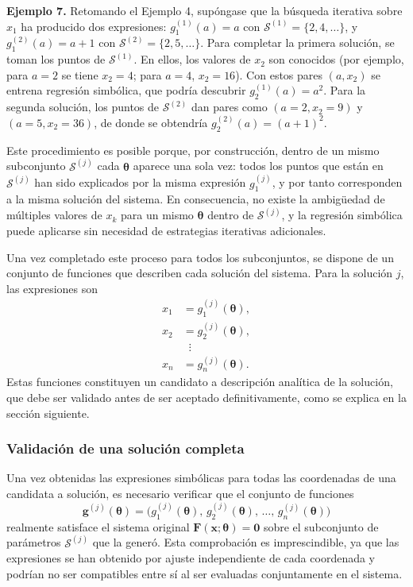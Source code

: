 \documentclass[12pt,a4paper]{article} \usepackage[utf8]{inputenc} \usepackage[spanish]{babel} \usepackage{amsmath, amssymb, amsthm} \usepackage{bm} \usepackage{float} \usepackage{longtable} \usepackage[hidelinks]{hyperref}
\newcommand{\xvec}{\mathbf{x}} \newcommand{\thetavec}{\boldsymbol{\theta}} \newcommand{\Fvec}{\mathbf{F}} \newcommand{\R}{\mathbb{R}} \newcommand{\norm}[1]{\left\lVert#1\right\rVert} \newcommand{\loss}{\mathcal{L}} \newcommand{\dataset}{\mathcal{D}} \newcommand{\jac}{\mathbf{J}}
\begin{document}
\bigskip
\noindent\textbf{Ejemplo 7.} Retomando el Ejemplo 4, supóngase que la
búsqueda iterativa sobre \(x_1\) ha producido dos expresiones:
\(g_1^{(1)}(a) = a\) con \(\mathcal{S}^{(1)} = \{2, 4, \dots\}\), y
\(g_1^{(2)}(a) = a + 1\) con \(\mathcal{S}^{(2)} = \{2, 5, \dots\}\).
Para completar la primera solución, se toman los puntos de
\(\mathcal{S}^{(1)}\). En ellos, los valores de \(x_2\) son conocidos
(por ejemplo, para \(a = 2\) se tiene \(x_2 = 4\); para \(a = 4\),
\(x_2 = 16\)). Con estos pares \((a, x_2)\) se entrena regresión
simbólica, que podría descubrir \(g_2^{(1)}(a) = a^2\). Para la segunda
solución, los puntos de \(\mathcal{S}^{(2)}\) dan pares como
\((a = 2, x_2 = 9)\) y \((a = 5, x_2 = 36)\), de donde se obtendría
\(g_2^{(2)}(a) = (a+1)^2\).

Este procedimiento es posible porque, por construcción, dentro de un
mismo subconjunto \(\mathcal{S}^{(j)}\) cada \(\thetavec\) aparece una
sola vez: todos los puntos que están en \(\mathcal{S}^{(j)}\) han sido
explicados por la misma expresión \(g_1^{(j)}\), y por tanto corresponden
a la misma solución del sistema. En consecuencia, no existe la
ambigüedad de múltiples valores de \(x_k\) para un mismo
\(\thetavec\) dentro de \(\mathcal{S}^{(j)}\), y la regresión simbólica
puede aplicarse sin necesidad de estrategias iterativas adicionales.

Una vez completado este proceso para todos los subconjuntos, se dispone
de un conjunto de funciones que describen cada solución del sistema.
Para la solución \(j\), las expresiones son
\[
\begin{aligned}
x_1 &= g_1^{(j)}(\thetavec), \\
x_2 &= g_2^{(j)}(\thetavec), \\
    &\;\;\vdots \\
x_n &= g_n^{(j)}(\thetavec).
\end{aligned}
\]
Estas funciones constituyen un candidato a descripción analítica de la
solución, que debe ser validado antes de ser aceptado
definitivamente, como se explica en la sección siguiente.

\subsubsection{Validación de una solución completa}
\label{sec:validacion_solucion}

Una vez obtenidas las expresiones simbólicas para todas las coordenadas
de una candidata a solución, es necesario verificar que el conjunto de
funciones
\[
\mathbf{g}^{(j)}(\thetavec) = \bigl( g_1^{(j)}(\thetavec),\,
g_2^{(j)}(\thetavec),\, \dots,\, g_n^{(j)}(\thetavec) \bigr)
\]
realmente satisface el sistema original \(\Fvec(\xvec; \thetavec) =
\mathbf{0}\) sobre el subconjunto de parámetros \(\mathcal{S}^{(j)}\)
que la generó. Esta comprobación es imprescindible, ya que las
expresiones se han obtenido por ajuste independiente de cada coordenada
y podrían no ser compatibles entre sí al ser evaluadas conjuntamente en
el sistema.
\end{document}
